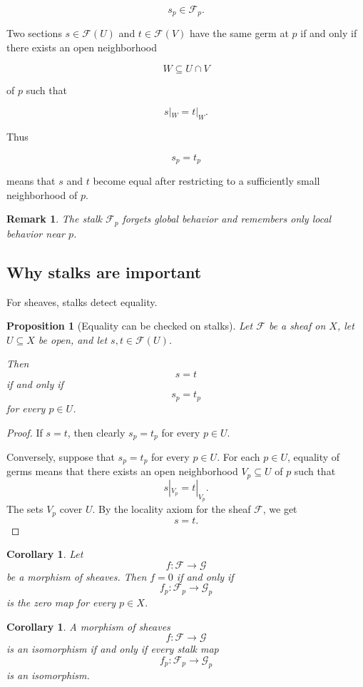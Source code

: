 \documentclass[12pt,a4paper]{article}
\newtheorem{corollary}[theorem]{Corollary}
\newtheorem{remark}[theorem]{Remark}
\newtheorem{proposition}{Proposition}[section]
\begin{document}
\[
s_p \in \mathcal F_p.
\]

Two sections $s \in \mathcal F(U)$ and $t \in \mathcal F(V)$ have the same germ
at $p$ if and only if there exists an open neighborhood

\[
W \subseteq U \cap V
\]

of $p$ such that

\[
s|_W = t|_W.
\]

Thus

\[
s_p=t_p
\]

means that $s$ and $t$ become equal after restricting to a sufficiently small
neighborhood of $p$.

\begin{remark}
	The stalk $\mathcal F_p$ forgets global behavior and remembers only local
	behavior near $p$.
\end{remark}

\subsection{Why stalks are important}

For sheaves, stalks detect equality.

\begin{proposition}[Equality can be checked on stalks]
	Let $\mathcal F$ be a sheaf on $X$, let $U \subseteq X$ be open, and let
	$s,t \in \mathcal F(U)$.
	
	Then
	\[
	s=t
	\]
	if and only if
	\[
	s_p=t_p
	\]
	for every $p \in U$.
\end{proposition}

\begin{proof}
	If $s=t$, then clearly $s_p=t_p$ for every $p \in U$.
	
	Conversely, suppose that $s_p=t_p$ for every $p \in U$.
	For each $p \in U$, equality of germs means that there exists an open
	neighborhood $V_p \subseteq U$ of $p$ such that
	\[
	s|_{V_p}=t|_{V_p}.
	\]
	The sets $V_p$ cover $U$.
	By the locality axiom for the sheaf $\mathcal F$, we get
	\[
	s=t.
	\]
\end{proof}

\begin{corollary}
	Let
	\[
	f : \mathcal F \longrightarrow \mathcal G
	\]
	be a morphism of sheaves. Then $f=0$ if and only if
	\[
	f_p : \mathcal F_p \longrightarrow \mathcal G_p
	\]
	is the zero map for every $p \in X$.
\end{corollary}

\begin{corollary}
	A morphism of sheaves
	\[
	f : \mathcal F \longrightarrow \mathcal G
	\]
	is an isomorphism if and only if every stalk map
	\[
	f_p : \mathcal F_p \longrightarrow \mathcal G_p
	\]
	is an isomorphism.
\end{corollary}
\end{document}
